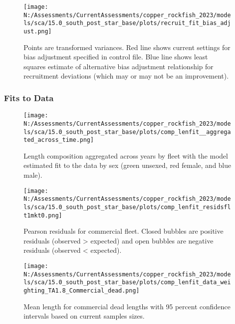 \documentclass[11pt,
  english,
  letterpaper,
]{article}
\begin{document}
\begin{figure}
\centering
\texttt{[image: N:/Assessments/CurrentAssessments/copper\_rockfish\_2023/models/sca/15.0\_south\_post\_star\_base/plots/recruit\_fit\_bias\_adjust.png]}
\caption{Points are transformed variances. Red line shows current settings for bias adjustment specified in control file. Blue line shows least squares estimate of alternative bias adjustment relationship for recruitment deviations (which may or may not be an improvement).\label{fig:bias-adjust}}
\end{figure}

\newpage

\hypertarget{fits-to-data}{%
\subsubsection{Fits to Data}\label{fits-to-data}}

\begin{figure}
\centering
\texttt{[image: N:/Assessments/CurrentAssessments/copper\_rockfish\_2023/models/sca/15.0\_south\_post\_star\_base/plots/comp\_lenfit\_\_aggregated\_across\_time.png]}
\caption{Length composition aggregated across years by fleet with the model estimated fit to the data by sex (green unsexed, red female, and blue male).\label{fig:len-agg-fit}}
\end{figure}

\pagebreak

\begin{figure}
\centering
\texttt{[image: N:/Assessments/CurrentAssessments/copper\_rockfish\_2023/models/sca/15.0\_south\_post\_star\_base/plots/comp\_lenfit\_residsflt1mkt0.png]}
\caption{Pearson residuals for commercial fleet. Closed bubbles are positive residuals (observed \textgreater{} expected) and open bubbles are negative residuals (observed \textless{} expected).\label{fig:com-dead-pearson}}
\end{figure}

\pagebreak

\begin{figure}
\centering
\texttt{[image: N:/Assessments/CurrentAssessments/copper\_rockfish\_2023/models/sca/15.0\_south\_post\_star\_base/plots/comp\_lenfit\_data\_weighting\_TA1.8\_Commercial\_dead.png]}
\caption{Mean length for commercial dead lengths with 95 percent confidence intervals based on current samples sizes.\label{fig:com-dead-mean-len-fit}}
\end{figure}
\end{document}
